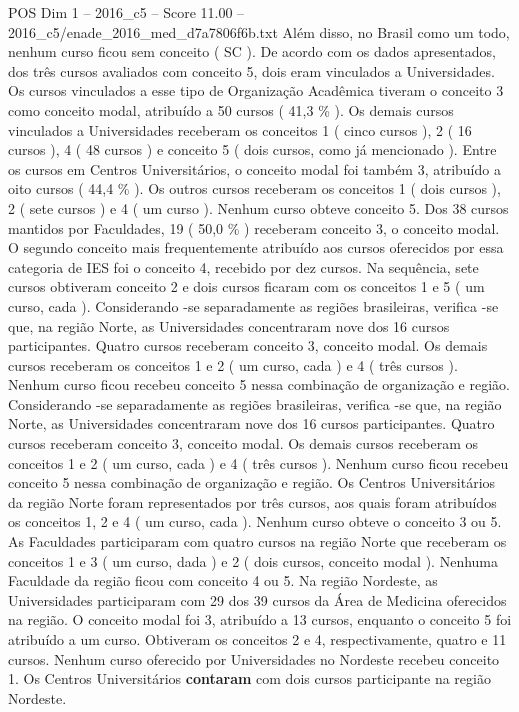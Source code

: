\begin{textsample}{POS Dim 1 – 2016\_c5 – Score 11.00 – 2016\_c5/enade\_2016\_med\_d7a7806f6b.txt}
Além disso, no Brasil como um todo, nenhum curso ficou sem conceito ( SC ).
De acordo com os dados apresentados, dos três cursos avaliados com conceito 5, dois eram vinculados a Universidades.
Os cursos vinculados a esse tipo de Organização Acadêmica tiveram o conceito 3 como conceito modal, atribuído a 50 cursos ( 41,3 \% ).
Os demais cursos vinculados a Universidades receberam os conceitos 1 ( cinco cursos ), 2 ( 16 cursos ), 4 ( 48 cursos ) e conceito 5 ( dois cursos, como já mencionado ).
Entre os cursos em Centros Universitários, o conceito modal foi também 3, atribuído a oito cursos ( 44,4 \% ).
Os outros cursos receberam os conceitos 1 ( dois cursos ), 2 ( sete cursos ) e 4 ( um curso ).
Nenhum curso obteve conceito 5.
Dos 38 cursos mantidos por Faculdades, 19 ( 50,0 \% ) receberam conceito 3, o conceito modal.
O segundo conceito mais frequentemente atribuído aos cursos oferecidos por essa categoria de IES foi o conceito 4, recebido por dez cursos.
Na sequência, sete cursos obtiveram conceito 2 e dois cursos ficaram com os conceitos 1 e 5 ( um curso, cada ).
Considerando -se separadamente as regiões brasileiras, verifica -se que, na região Norte, as Universidades concentraram nove dos 16 cursos participantes.
Quatro cursos receberam conceito 3, conceito modal.
Os demais cursos receberam os conceitos 1 e 2 ( um curso, cada ) e 4 ( três cursos ).
Nenhum curso ficou recebeu conceito 5 nessa combinação de organização e região.
Considerando -se separadamente as regiões brasileiras, verifica -se que, na região Norte, as Universidades concentraram nove dos 16 cursos participantes.
Quatro cursos receberam conceito 3, conceito modal.
Os demais cursos receberam os conceitos 1 e 2 ( um curso, cada ) e 4 ( três cursos ).
Nenhum curso ficou recebeu conceito 5 nessa combinação de organização e região.
Os Centros Universitários da região Norte foram representados por três cursos, aos quais foram atribuídos os conceitos 1, 2 e 4 ( um curso, cada ).
Nenhum curso obteve o conceito 3 ou 5.
As Faculdades participaram com quatro cursos na região Norte que receberam os conceitos 1 e 3 ( um curso, dada ) e 2 ( dois cursos, conceito modal ).
Nenhuma Faculdade da região ficou com conceito 4 ou 5.
Na região Nordeste, as Universidades participaram com 29 dos 39 cursos da Área de Medicina oferecidos na região.
O conceito modal foi 3, atribuído a 13 cursos, enquanto o conceito 5 foi atribuído a um curso.
Obtiveram os conceitos 2 e 4, respectivamente, quatro e 11 cursos.
Nenhum curso oferecido por Universidades no Nordeste recebeu conceito 1.
Os Centros Universitários \textbf{contaram} com dois cursos participante na região Nordeste.

\end{textsample}
